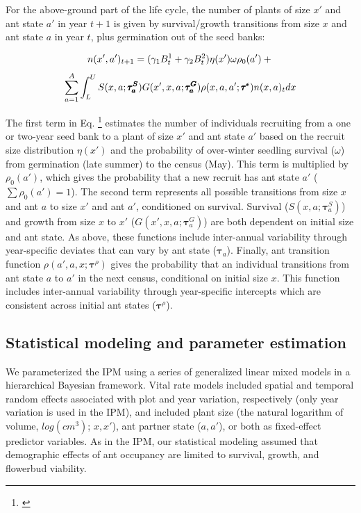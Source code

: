 \documentclass[11pt]{article}
\newcommand{\tom}[2]{{\color{red}{#1}}\footnote{\textit{\color{red}{#2}}}}
\begin{document}
For the above-ground part of the life cycle, the number of plants of size $x'$ and ant state $a'$ in year $t+1$ is given by survival/growth transitions from size $x$ and ant state $a$ in year $t$, plus germination out of the seed banks:
\begin{linenomath*}
	$$
	n(x',a')_{t+1} = (\gamma_1 B^1_{t} + \gamma_2 B^2_{t} ) \eta(x') \omega \rho_{0}(a')  + \\
	$$
	$$
	\sum_{a=1}^{A} \int_L^U S(x,a;\pmb{\tau^S_{a}}) G(x',x,a;\pmb{\tau^G_{a}}) \rho(x,a,a';\pmb{\tau^{\epsilon}}) n(x,a)_t dx \\
	$$
	\label{eqn:IPM2}
\end{linenomath*}

\noindent The first term in Eq. \tom{\ref{eqn:IPM2}}{We should label equations. I am not sure why the equation label is not working here and I did not try to figure it out. It is probably something with the linenomath formatting.} estimates the number of individuals recruiting from a one or two-year seed bank to a plant of size $x'$ and ant state $a'$ based on the recruit size distribution $\eta(x')$ and the probability of over-winter seedling survival ($\omega$) from germination (late summer) to the census (May).
This term is multiplied by $\rho_{0}(a')$, which gives the probability that a new recruit has ant state $a'$ ($\sum\rho_{0}(a')=1$). 
The second term represents all possible transitions from size $x$ and ant $a$ to size $x'$ and ant $a'$, conditioned on survival. 
Survival ($S(x,a;\pmb{\tau}^S_{a})$) and growth from size $x$ to $x'$ ($G(x',x,a;\pmb{\tau}^G_{a})$) are both dependent on initial size and ant state. 
As above, these functions include inter-annual variability through year-specific deviates that can vary by ant state ($\pmb{\tau}_{a}$). 
Finally, ant transition function $\rho(a',a,x;\pmb{\tau}^{\rho})$ gives the probability that an individual transitions from ant state $a$ to $a'$ in the next census, conditional on initial size $x$. 
This function includes inter-annual variability through year-specific intercepts which are consistent across initial ant states ($\pmb{\tau}^\rho$).

\subsection*{Statistical modeling and parameter estimation}
We parameterized the IPM using a series of generalized linear mixed models in a hierarchical Bayesian framework. 
Vital rate models included spatial and temporal random effects associated with plot and year variation, respectively (only year variation is used in the IPM), and included plant size (the natural logarithm of volume, $log(cm^3)$; $x,x'$), ant partner state ($a,a'$), or both as fixed-effect predictor variables. 
As in the IPM, our statistical modeling assumed that demographic effects of ant occupancy are limited to survival, growth, and flowerbud viability. 
\end{document}
